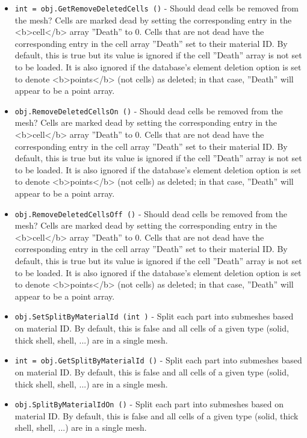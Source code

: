 \begin{itemize}
\item  \verb|int = obj.GetRemoveDeletedCells ()| -  Should dead cells be removed from the mesh?  Cells are marked dead by
 setting the corresponding entry in the <b>cell</b> array ''Death'' to 0.
 Cells that are not dead have the corresponding entry in the cell array
 ''Death'' set to their material ID.  By default, this is true but its
 value is ignored if the cell ''Death'' array is not set to be loaded.
 It is also ignored if the database's element deletion option is set to
 denote <b>points</b> (not cells) as deleted; in that case, ''Death''
 will appear to be a point array.

\item  \verb|obj.RemoveDeletedCellsOn ()| -  Should dead cells be removed from the mesh?  Cells are marked dead by
 setting the corresponding entry in the <b>cell</b> array ''Death'' to 0.
 Cells that are not dead have the corresponding entry in the cell array
 ''Death'' set to their material ID.  By default, this is true but its
 value is ignored if the cell ''Death'' array is not set to be loaded.
 It is also ignored if the database's element deletion option is set to
 denote <b>points</b> (not cells) as deleted; in that case, ''Death''
 will appear to be a point array.

\item  \verb|obj.RemoveDeletedCellsOff ()| -  Should dead cells be removed from the mesh?  Cells are marked dead by
 setting the corresponding entry in the <b>cell</b> array ''Death'' to 0.
 Cells that are not dead have the corresponding entry in the cell array
 ''Death'' set to their material ID.  By default, this is true but its
 value is ignored if the cell ''Death'' array is not set to be loaded.
 It is also ignored if the database's element deletion option is set to
 denote <b>points</b> (not cells) as deleted; in that case, ''Death''
 will appear to be a point array.

\item  \verb|obj.SetSplitByMaterialId (int )| -  Split each part into submeshes based on material ID.
 By default, this is false and all cells of a given
 type (solid, thick shell, shell, ...) are in a single mesh.

\item  \verb|int = obj.GetSplitByMaterialId ()| -  Split each part into submeshes based on material ID.
 By default, this is false and all cells of a given
 type (solid, thick shell, shell, ...) are in a single mesh.

\item  \verb|obj.SplitByMaterialIdOn ()| -  Split each part into submeshes based on material ID.
 By default, this is false and all cells of a given
 type (solid, thick shell, shell, ...) are in a single mesh.


\end{itemize}
